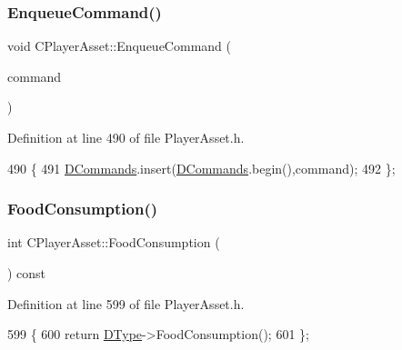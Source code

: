 \subsubsection{\texorpdfstring{Enqueue\+Command()}{EnqueueCommand()}}
{\footnotesize\ttfamily void C\+Player\+Asset\+::\+Enqueue\+Command (\begin{DoxyParamCaption}\item[{const \hyperlink{structSAssetCommand}{S\+Asset\+Command} \&}]{command }\end{DoxyParamCaption})\hspace{0.3cm}{\ttfamily [inline]}}



Definition at line 490 of file Player\+Asset.\+h.


\begin{DoxyCode}
490                                                          \{
491             \hyperlink{classCPlayerAsset_a4d3b96106d3b1c1020f98005884d2a87}{DCommands}.insert(\hyperlink{classCPlayerAsset_a4d3b96106d3b1c1020f98005884d2a87}{DCommands}.begin(),command);
492         \};
\end{DoxyCode}
\hypertarget{classCPlayerAsset_ab95c988b7c13ed8c686da8f354d120f4}{}\label{classCPlayerAsset_ab95c988b7c13ed8c686da8f354d120f4} 
\subsubsection{\texorpdfstring{Food\+Consumption()}{FoodConsumption()}}
{\footnotesize\ttfamily int C\+Player\+Asset\+::\+Food\+Consumption (\begin{DoxyParamCaption}{ }\end{DoxyParamCaption}) const\hspace{0.3cm}{\ttfamily [inline]}}



Definition at line 599 of file Player\+Asset.\+h.


\begin{DoxyCode}
599                                    \{
600             \textcolor{keywordflow}{return} \hyperlink{classCPlayerAsset_a5d61f73471e1e6f0a6ab15f2ffa7b359}{DType}->FoodConsumption(); 
601         \};
\end{DoxyCode}
\hypertarget{classCPlayerAsset_a03ee2a60c0d332675b4b30573b96d64f}{}\label{classCPlayerAsset_a03ee2a60c0d332675b4b30573b96d64f} 
